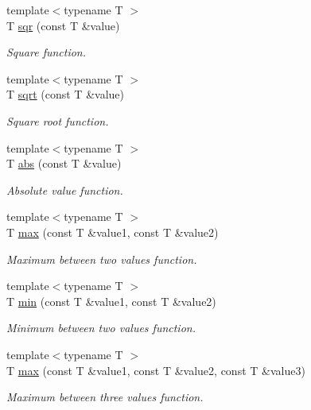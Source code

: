 \begin{DoxyCompactItemize}
{\footnotesize template$<$typename T $>$ }\\T \hyperlink{namespaceacme_a722297e283d0b656d1b3f64222acb175}{sqr} (const T \&value)
\begin{DoxyCompactList}\small\item\em Square function. \end{DoxyCompactList}\item 
{\footnotesize template$<$typename T $>$ }\\T \hyperlink{namespaceacme_a6727bc4e9b202cb40e59065a01d9368b}{sqrt} (const T \&value)
\begin{DoxyCompactList}\small\item\em Square root function. \end{DoxyCompactList}\item 
{\footnotesize template$<$typename T $>$ }\\T \hyperlink{namespaceacme_add7b88267b101300f6818a0ed6dacf2a}{abs} (const T \&value)
\begin{DoxyCompactList}\small\item\em Absolute value function. \end{DoxyCompactList}\item 
{\footnotesize template$<$typename T $>$ }\\T \hyperlink{namespaceacme_abc0dd1e2a5441a08af324075636ea74a}{max} (const T \&value1, const T \&value2)
\begin{DoxyCompactList}\small\item\em Maximum between two values function. \end{DoxyCompactList}\item 
{\footnotesize template$<$typename T $>$ }\\T \hyperlink{namespaceacme_a8e3d214c67f792ca4deef35481ea8b12}{min} (const T \&value1, const T \&value2)
\begin{DoxyCompactList}\small\item\em Minimum between two values function. \end{DoxyCompactList}\item 
{\footnotesize template$<$typename T $>$ }\\T \hyperlink{namespaceacme_aca4726ee714290f5715f97242fd61cea}{max} (const T \&value1, const T \&value2, const T \&value3)
\begin{DoxyCompactList}\small\item\em Maximum between three values function. \end{DoxyCompactList}\item 

\end{DoxyCompactItemize}
